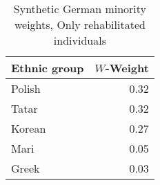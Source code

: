 \begin{table}[t]

\caption{\label{tab:sc_weights_rehabs}Synthetic German minority weights, Only rehabilitated individuals}
\centering
\begin{tabular}{lr}
\toprule
Ethnic group & $W$-Weight\\
\midrule
Polish & 0.32\\
Tatar & 0.32\\
Korean & 0.27\\
Mari & 0.05\\
Greek & 0.03\\
\bottomrule
\end{tabular}
\end{table}